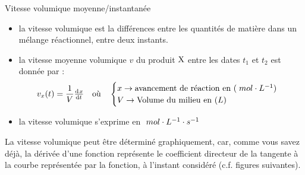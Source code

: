 \documentclass[11pt,a4paper]{article}
\begin{document}
\begin{defn}{Vitesse volumique moyenne/instantanée}
\begin{itemize}
    \item la vitesse volumique est la différences entre les quantités de matière dans un mélange réactionnel, entre deux instants. 
    \item la vitesse moyenne volumique $v$ du produit $\ce{X}$ entre les dates $t_1$ et $t_2$ est donnée par : 
    \[ v_x(t) = \frac{1}{V}\od{x}{t} \quad \text{où}\quad \begin{cases}
    x \rightarrow \text{avancement de réaction en }(\mpl) \\
    V \rightarrow \text{Volume du milieu en }(L) \\ 
     \end{cases} \]
    \item la vitesse volumique s'exprime en $\; mol\cdot L^{-1}\cdot s^{-1}$ 
\end{itemize}
\end{defn}

La vitesse volumique peut être déterminé graphiquement, car, comme vous savez déjà, la dérivée d'une fonction représente le coefficient directeur de la tangente à la courbe représentée par la fonction, à l'instant considéré (c.f. figures suivantes). 
\end{document}

